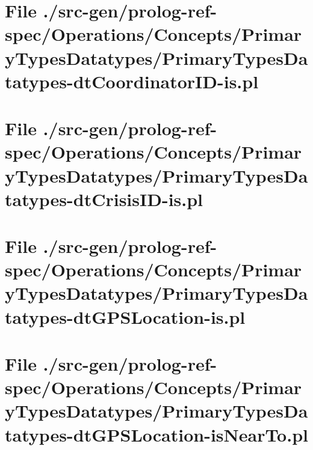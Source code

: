 \section[File /src-gen/prolog-ref-spec.../PrimaryTypesDatatypes-dtCoordinatorID-is.pl]{File ./src-gen/prolog-ref-spec/Operations/Concepts/PrimaryTypesDatatypes/PrimaryTypesDatatypes-dtCoordinatorID-is.pl}
\scriptsize

\normalsize
	
\section[File /src-gen/prolog-ref-spec.../PrimaryTypesDatatypes-dtCrisisID-is.pl]{File ./src-gen/prolog-ref-spec/Operations/Concepts/PrimaryTypesDatatypes/PrimaryTypesDatatypes-dtCrisisID-is.pl}
\scriptsize

\normalsize
	
\section[File /src-gen/prolog-ref-spec.../PrimaryTypesDatatypes-dtGPSLocation-is.pl]{File ./src-gen/prolog-ref-spec/Operations/Concepts/PrimaryTypesDatatypes/PrimaryTypesDatatypes-dtGPSLocation-is.pl}
\scriptsize

\normalsize
	
\section[File /src-gen.../PrimaryTypesDatatypes-dtGPSLocation-isNearTo.pl]{File ./src-gen/prolog-ref-spec/Operations/Concepts/PrimaryTypesDatatypes/PrimaryTypesDatatypes-dtGPSLocation-isNearTo.pl}
\scriptsize

\normalsize
	
